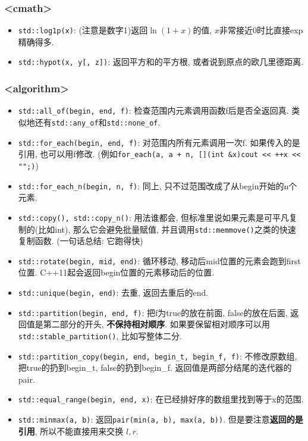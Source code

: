 \subsubsection{<cmath>}

\begin{itemize}
	\item \texttt{std::log1p(x)}: (注意是数字1)返回$\ln(1 + x)$的值, $x$非常接近$0$时比直接exp精确得多.
	\item \texttt{std::hypot(x, y[, z])}: 返回平方和的平方根, 或者说到原点的欧几里德距离.
\end{itemize}

\subsubsection{<algorithm>}

\begin{itemize}
	\item \texttt{std::all_of(begin, end, f)}: 检查范围内元素调用函数f后是否全返回真. 类似地还有\texttt{std::any_of}和\texttt{std::none_of}.
	\item \texttt{std::for_each(begin, end, f)}: 对范围内所有元素调用一次f. 如果传入的是引用, 也可以用f修改. (例如\texttt{for_each(a, a + n, [](int &x){cout << ++x << "\n";})})
	\item \texttt{std::for_each_n(begin, n, f)}: 同上, 只不过范围改成了从begin开始的n个元素.
	\item \texttt{std::copy(), std::copy_n()}: 用法谁都会, 但标准里说如果元素是可平凡复制的(比如int), 那么它会避免批量赋值, 并且调用\texttt{std::memmove()}之类的快速复制函数. (一句话总结: 它跑得快)
	\item \texttt{std::rotate(begin, mid, end)}: 循环移动, 移动后mid位置的元素会跑到first位置. C++11起会返回begin位置的元素移动后的位置.
	\item \texttt{std::unique(begin, end)}: 去重, 返回去重后的end.
	\item \texttt{std::partition(begin, end, f)}: 把f为true的放在前面, false的放在后面, 返回值是第二部分的开头, \textbf{不保持相对顺序}. 如果要保留相对顺序可以用\texttt{std::stable_partition()}, 比如写整体二分.
	\item \texttt{std::partition_copy(begin, end, begin_t, begin_f, f)}: 不修改原数组, 把true的扔到begin\_t, false的扔到begin\_f. 返回值是两部分结尾的迭代器的pair.
	\item \texttt{std::equal_range(begin, end, x)}: 在已经排好序的数组里找到等于x的范围.
	\item \texttt{std::minmax(a, b)}: 返回\texttt{pair(min(a, b), max(a, b))}. 但是要注意\textbf{返回的是引用}, 所以不能直接用来交换 $l, r$.
\end{itemize}

